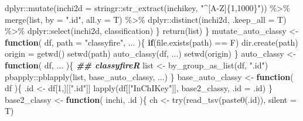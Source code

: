 \documentclass[
]{article}
\newenvironment{Shaded}{\begin{snugshade}}{\end{snugshade}}
\newcommand{\AttributeTok}[1]{\textcolor[rgb]{0.77,0.63,0.00}{#1}}
\newcommand{\ControlFlowTok}[1]{\textcolor[rgb]{0.13,0.29,0.53}{\textbf{#1}}}
\newcommand{\DecValTok}[1]{\textcolor[rgb]{0.00,0.00,0.81}{#1}}
\newcommand{\DocumentationTok}[1]{\textcolor[rgb]{0.56,0.35,0.01}{\textbf{\textit{#1}}}}
\newcommand{\FunctionTok}[1]{\textcolor[rgb]{0.00,0.00,0.00}{#1}}
\newcommand{\NormalTok}[1]{#1}
\newcommand{\OtherTok}[1]{\textcolor[rgb]{0.56,0.35,0.01}{#1}}
\newcommand{\SpecialCharTok}[1]{\textcolor[rgb]{0.00,0.00,0.00}{#1}}
\newcommand{\StringTok}[1]{\textcolor[rgb]{0.31,0.60,0.02}{#1}}
\begin{document}
\begin{Shaded}
\begin{Highlighting}[]
\NormalTok{        dplyr}\SpecialCharTok{::}\FunctionTok{mutate}\NormalTok{(}\AttributeTok{inchi2d =}\NormalTok{ stringr}\SpecialCharTok{::}\FunctionTok{str\_extract}\NormalTok{(inchikey, }\StringTok{"\^{}[A{-}Z]\{1,1000\}"}\NormalTok{)) }\SpecialCharTok{\%\textgreater{}\%} 
        \FunctionTok{merge}\NormalTok{(list, }\AttributeTok{by =} \StringTok{".id"}\NormalTok{, }\AttributeTok{all.y =}\NormalTok{ T) }\SpecialCharTok{\%\textgreater{}\%} 
\NormalTok{        dplyr}\SpecialCharTok{::}\FunctionTok{distinct}\NormalTok{(inchi2d, }\AttributeTok{.keep\_all =}\NormalTok{ T) }\SpecialCharTok{\%\textgreater{}\%} 
\NormalTok{        dplyr}\SpecialCharTok{::}\FunctionTok{select}\NormalTok{(inchi2d, classification)}
\NormalTok{    \}}
    \FunctionTok{return}\NormalTok{(list)}
\NormalTok{  \}}
\NormalTok{mutate\_auto\_classy }\OtherTok{\textless{}{-}} 
  \ControlFlowTok{function}\NormalTok{(}
\NormalTok{           df,}
           \AttributeTok{path =} \StringTok{"classyfire"}\NormalTok{,}
\NormalTok{           ...}
\NormalTok{           )\{}
    \ControlFlowTok{if}\NormalTok{(}\FunctionTok{file.exists}\NormalTok{(path) }\SpecialCharTok{==}\NormalTok{ F)}
      \FunctionTok{dir.create}\NormalTok{(path)}
\NormalTok{    origin }\OtherTok{=} \FunctionTok{getwd}\NormalTok{()}
    \FunctionTok{setwd}\NormalTok{(path)}
    \FunctionTok{auto\_classy}\NormalTok{(df, ...)}
    \FunctionTok{setwd}\NormalTok{(origin)}
\NormalTok{  \}}
\NormalTok{auto\_classy }\OtherTok{\textless{}{-}} 
  \ControlFlowTok{function}\NormalTok{(}
\NormalTok{           df,}
\NormalTok{           ...}
\NormalTok{           )\{}
    \DocumentationTok{\#\# classyfireR}
\NormalTok{    list }\OtherTok{\textless{}{-}} \FunctionTok{by\_group\_as\_list}\NormalTok{(df, }\StringTok{".id"}\NormalTok{)}
\NormalTok{    pbapply}\SpecialCharTok{::}\FunctionTok{pblapply}\NormalTok{(list, base\_auto\_classy,}
\NormalTok{                        ...)}
\NormalTok{  \}}
\NormalTok{base\_auto\_classy }\OtherTok{\textless{}{-}} 
  \ControlFlowTok{function}\NormalTok{(}
\NormalTok{           df}
\NormalTok{           )\{}
\NormalTok{    .id }\OtherTok{\textless{}{-}}\NormalTok{ df[}\DecValTok{1}\NormalTok{,][[}\StringTok{".id"}\NormalTok{]]}
    \FunctionTok{lapply}\NormalTok{(df[[}\StringTok{"InChIKey"}\NormalTok{]], base2\_classy,}
                      \AttributeTok{.id =}\NormalTok{ .id)}
\NormalTok{  \}}
\NormalTok{base2\_classy }\OtherTok{\textless{}{-}} 
  \ControlFlowTok{function}\NormalTok{(}
\NormalTok{           inchi,}
\NormalTok{           .id}
\NormalTok{           )\{}
\NormalTok{    ch }\OtherTok{\textless{}{-}} \FunctionTok{try}\NormalTok{(}\FunctionTok{read\_tsv}\NormalTok{(}\FunctionTok{paste0}\NormalTok{(.id)), }\AttributeTok{silent =}\NormalTok{ T)}

\end{Highlighting}
\end{Shaded}
\end{document}
